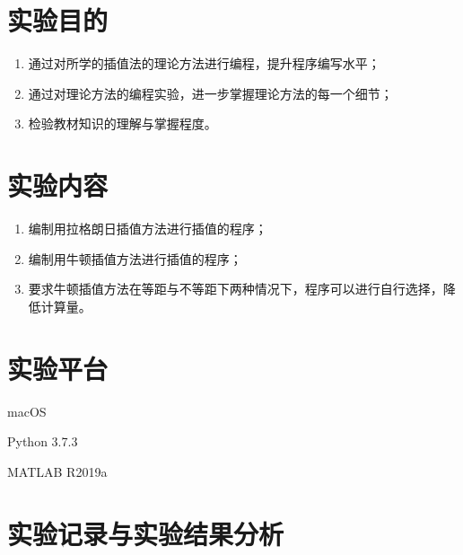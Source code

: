 






\newcommand{\ThisProjectTitle}{插值法}
\newcommand{\ThisDate}{2017-11-29}
\newcommand{\ThisNo}{No.3}






\section{实验目的}
\begin{enumerate}[leftmargin=1.4cm, itemsep=-0.5mm]
    \item 通过对所学的插值法的理论方法进行编程，提升程序编写水平；
    \item 通过对理论方法的编程实验，进一步掌握理论方法的每一个细节；
    \item 检验教材知识的理解与掌握程度。
    
\end{enumerate}

\section{实验内容}
\begin{enumerate}[leftmargin=1.4cm, itemsep=-0.5mm]
    \item 编制用拉格朗日插值方法进行插值的程序；
    \item 编制用牛顿插值方法进行插值的程序；
    \item 要求牛顿插值方法在等距与不等距下两种情况下，程序可以进行自行选择，降低计算量。
\end{enumerate}

\section{实验平台}

macOS

Python 3.7.3

MATLAB R2019a

\section{实验记录与实验结果分析}

